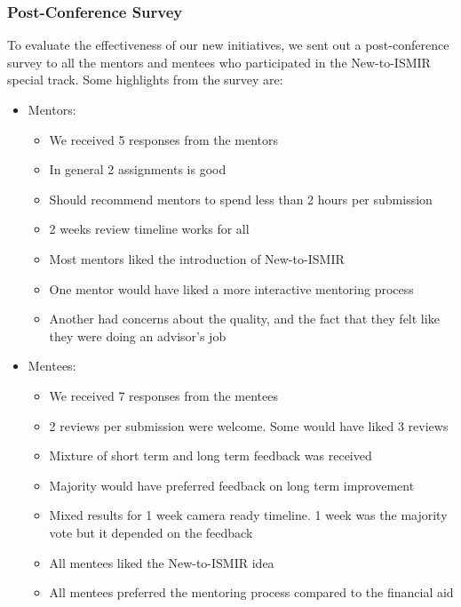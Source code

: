 \documentclass[%
10pt,								%
]
{scrartcl}
\begin{document}
        \subsubsection{Post-Conference Survey}
            To evaluate the effectiveness of our new initiatives, we sent out a post-conference survey to all the mentors and mentees who participated in the New-to-ISMIR special track. Some highlights from the survey are:
            \begin{itemize}
                \item Mentors:
                    \begin{itemize}
                        \item   We received 5 responses from the mentors
                        \item   In general 2 assignments is good
                        \item   Should recommend mentors to spend less than 2 hours per submission
                        \item   2 weeks review timeline works for all
                        \item   Most mentors liked the introduction of New-to-ISMIR
                        \item   One mentor would have liked a more interactive mentoring process
                        \item   Another had concerns about the quality, and the fact that they felt like they were doing an advisor's job
                    \end{itemize}
                \item   Mentees:
                    \begin{itemize}
                        \item   We received 7 responses from the mentees
                        \item   2 reviews per submission were welcome. Some would have liked 3 reviews
                        \item   Mixture of short term and long term feedback was received
                        \item   Majority would have preferred feedback on long term improvement
                        \item   Mixed results for 1 week camera ready timeline. 1 week was the majority vote but it depended on the feedback
                        \item   All mentees liked the New-to-ISMIR idea
                        \item   All mentees preferred the mentoring process compared to the financial aid
                    \end{itemize}
            \end{itemize}
\end{document}
